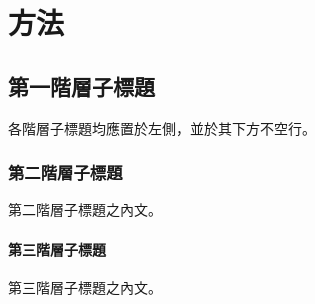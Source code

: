 \chapter{方法}
\label{c:3}

\section{第一階層子標題}

各階層子標題均應置於左側，並於其下方不空行。

\subsection{第二階層子標題}

第二階層子標題之內文。

\subsubsection{第三階層子標題}

第三階層子標題之內文。


%
% 